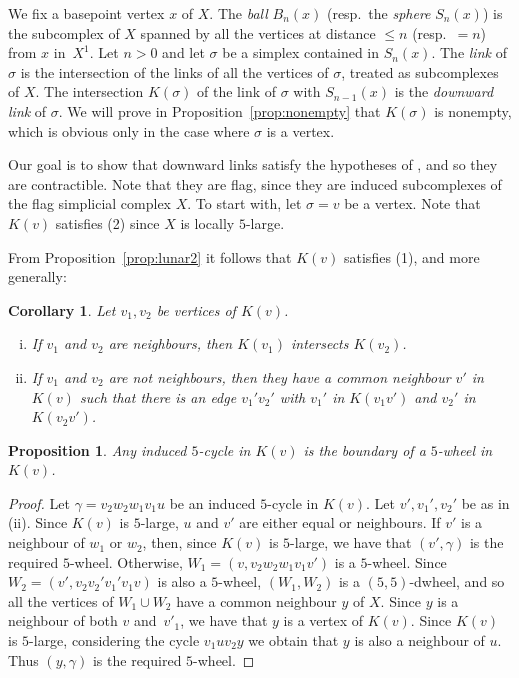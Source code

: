 \documentclass[a4paper,12pt,leqno]{amsart}
\newtheorem{prop}[thm]{Proposition}
\newtheorem{cor}[thm]{Corollary}
\theoremstyle{definition}
\begin{document}
We fix a basepoint vertex $x$ of $X$. The \emph{ball} $B_n(x)$ (resp.\ the \emph{sphere} $S_n(x)$) is the subcomplex of $X$ spanned by all the vertices at distance $\leq n$ (resp.\ $=n$) from $x$ in~$X^1$.
Let $n > 0$ and let $\sigma$ be a simplex contained in $S_n(x)$. The \emph{link} of $\sigma$ is the intersection of the links of all the vertices of $\sigma$, treated as subcomplexes of $X$. The intersection $K(\sigma)$ of the link of $\sigma$ with $S_{n-1}(x)$ is the \emph{downward link} of $\sigma$. We will prove in Proposition~\ref{prop:nonempty} that $K(\sigma)$ is nonempty, which is obvious only in the case where $\sigma$ is a vertex.



Our goal is to show that downward links satisfy the hypotheses of , and so they are contractible. Note that they are flag, since they are induced subcomplexes of the flag simplicial complex $X$. To start with, let $\sigma=v$ be a vertex. Note that $K(v)$
satisfies (2) since $X$ is locally $5$-large.

From Proposition~\ref{prop:lunar2} it follows that $K(v)$
satisfies (1), and more generally:

\begin{cor} \label{prop: diam of K}
Let $v_1,v_2$ be vertices of $K(v)$.
\begin{enumerate}[(i)]
    \item If $v_1$ and $v_2$ are neighbours, then $K(v_1)$ intersects $ K(v_2)$.
    \item If $v_1$ and $v_2$ are not neighbours, then 
    they have a common neighbour $v'$ in~$K(v)$ such that there is an edge $v_1'v_2'$ with $v_1'$ in $K(v_1v')$ and $v_2'$ in $K(v_2v')$.
\end{enumerate}
\end{cor}
    

\begin{prop}
    Any induced $5$-cycle in $K(v)$ is the boundary of a $5$-wheel in~$K(v)$.
\end{prop}

\begin{proof}
    Let $\gamma=v_2w_2w_1v_1u$ be an induced $5$-cycle in $K(v)$. 
    Let $v', v_1',v_2'$ be as in (ii). Since $K(v)$ is $5$-large, $u$ and $v'$ are either equal or neighbours. If $v'$ is a neighbour of $w_1$ or $w_2$, then, since $K(v)$ is $5$-large, we have that $(v',\gamma)$ is the required $5$-wheel. Otherwise, $W_1 = (v,v_2w_2w_1v_1v')$ is a $5$-wheel. Since $W_2=(v',v_2v_2'v_1'v_1v)$ is also a $5$-wheel, $(W_1,W_2)$ 
    is a $(5,5)$-dwheel, and so all the vertices of $W_1\cup W_2$ have a common neighbour $y$ of $X$. Since $y$ is a neighbour of both $v$ and~$v'_1$, we have that $y$ is a vertex of $K(v)$. Since $K(v)$ is $5$-large, considering the cycle $v_1uv_2y$ we obtain that $y$ is also a neighbour of $u$. Thus $(y,\gamma)$ is the required $5$-wheel.
  
\end{proof}
\end{document}
